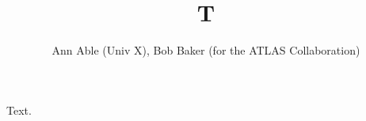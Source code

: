 \documentclass{article}
\begin{document}
\title{T}
\author{Ann Able (Univ X), Bob Baker (for the ATLAS Collaboration)}
\maketitle
Text.
\end{document}
